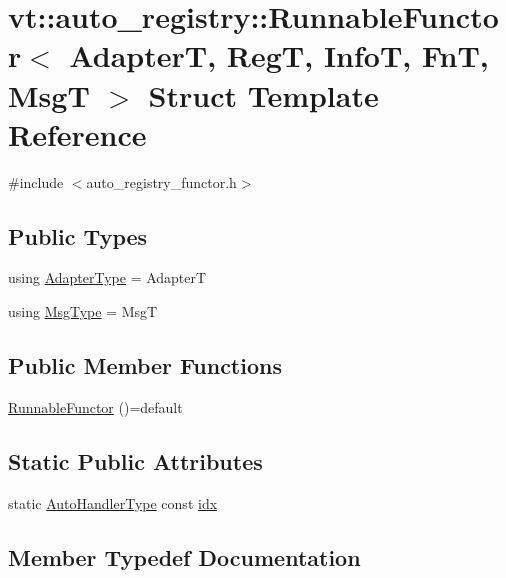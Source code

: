 \hypertarget{structvt_1_1auto__registry_1_1_runnable_functor}{}\section{vt\+:\+:auto\+\_\+registry\+:\+:Runnable\+Functor$<$ AdapterT, RegT, InfoT, FnT, MsgT $>$ Struct Template Reference}
\label{structvt_1_1auto__registry_1_1_runnable_functor}


{\ttfamily \#include $<$auto\+\_\+registry\+\_\+functor.\+h$>$}

\subsection*{Public Types}
\begin{DoxyCompactItemize}
\item 
using \hyperlink{structvt_1_1auto__registry_1_1_runnable_functor_adfb8bb866924c02571131349c69a5a1b}{Adapter\+Type} = AdapterT
\item 
using \hyperlink{structvt_1_1auto__registry_1_1_runnable_functor_ab1990f958c35309ebb8be7de8baf4312}{Msg\+Type} = MsgT
\end{DoxyCompactItemize}
\subsection*{Public Member Functions}
\begin{DoxyCompactItemize}
\item 
\hyperlink{structvt_1_1auto__registry_1_1_runnable_functor_a939a7cf3315f01bfcfd182e73073dc6b}{Runnable\+Functor} ()=default
\end{DoxyCompactItemize}
\subsection*{Static Public Attributes}
\begin{DoxyCompactItemize}
\item 
static \hyperlink{namespacevt_1_1auto__registry_ae295e18699146815bb7d7674594d95d7}{Auto\+Handler\+Type} const \hyperlink{structvt_1_1auto__registry_1_1_runnable_functor_a74064bd96047b8a1093848183ed28ed9}{idx}
\end{DoxyCompactItemize}


\subsection{Member Typedef Documentation}
\mbox{\label{structvt_1_1auto__registry_1_1_runnable_functor_adfb8bb866924c02571131349c69a5a1b}} 

